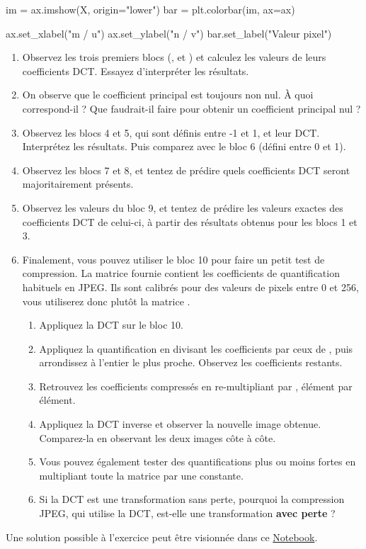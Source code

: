 \documentclass [a4paper, 11pt] {article}
\begin{document}
\begin{exercice}{2}
\begin{python}
    im = ax.imshow(X, origin="lower")
    bar = plt.colorbar(im, ax=ax)

    ax.set_xlabel("m / u")
    ax.set_ylabel("n / v")
    bar.set_label("Valeur pixel")
        \end{python}
    
    \begin{enumerate}
        \item Observez les trois premiers blocs (,  et ) et calculez les valeurs de leurs coefficients DCT. Essayez d’interpréter les résultats.
        \item On observe que le coefficient principal est toujours non nul. À quoi correspond-il ? Que faudrait-il faire pour obtenir un coefficient principal nul ?
        \item Observez les blocs 4 et 5, qui sont définis entre -1 et 1, et leur DCT. Interprétez les résultats. Puis comparez avec le bloc 6 (défini entre 0 et 1).
        \item Observez les blocs 7 et 8, et tentez de prédire quels coefficients DCT seront majoritairement présents.
        \item Observez les valeurs du bloc 9, et tentez de prédire les valeurs exactes des coefficients DCT de celui-ci, à partir des résultats obtenus pour les blocs 1 et 3.
        \item Finalement, vous pouvez utiliser le bloc 10 pour faire un petit test de compression. La matrice  fournie contient les coefficients de quantification habituels en JPEG. Ils sont calibrés pour des valeurs de pixels entre 0 et 256, vous utiliserez donc plutôt la matrice .
        \begin{enumerate}
            \item Appliquez la DCT sur le bloc 10.
            \item Appliquez la quantification en divisant les coefficients par ceux de , puis arrondissez à l’entier le plus proche. Observez les coefficients restants.
            \item Retrouvez les coefficients compressés en re-multipliant par , élément par élément.
            \item Appliquez la DCT inverse et observer la nouvelle image obtenue. Comparez-la en observant les deux images côte à côte.
            \item Vous pouvez également tester des quantifications plus ou moins fortes en multipliant toute la matrice  par une constante.
            \item Si la DCT est une transformation sans perte, pourquoi la compression JPEG, qui utilise la DCT, est-elle une transformation \textbf{avec perte} ?
        \end{enumerate}
    \end{enumerate}
    
    \end{exercice}
    
    \begin{reponse}
        Une solution possible à l'exercice peut être visionnée dans ce \href{https://github.com/jeertmans/LELEC1930/blob/main/notebooks/seance4.ipynb}{Notebook}.
    \end{reponse}
\end{document}
